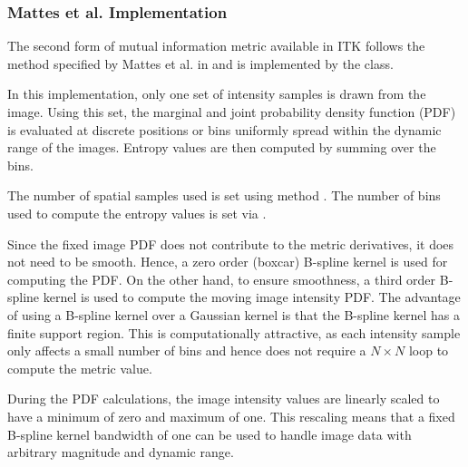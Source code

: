 \subsubsection{Mattes et al. Implementation}
The second form of mutual information metric available in ITK follows the
method specified by Mattes et al. in \cite{Mattes2001} and is implemented by
the  class.

In this implementation, only one set of intensity samples is drawn from the
image.  Using this set, the marginal and joint probability density function
(PDF) is evaluated at discrete positions or bins uniformly spread within the
dynamic range of the images. Entropy values are then computed by summing over
the bins.


The number of spatial samples used is set using method 
. The number of bins used to compute
the entropy values is set via .

Since the fixed image PDF does not contribute to the metric derivatives, it
does not need to be smooth. Hence, a zero order (boxcar) B-spline kernel is
used for computing the PDF. On the other hand, to ensure smoothness, a third
order B-spline kernel is used to compute the moving image intensity PDF. The
advantage of using a B-spline kernel over a Gaussian kernel is that the
B-spline kernel has a finite support region. This is computationally
attractive, as each intensity sample only affects a small number of bins and
hence does not require a $N \times N$ loop to compute the metric value.

During the PDF calculations, the image intensity values are linearly scaled
to have a minimum of zero and maximum of one. This rescaling means that a
fixed B-spline kernel bandwidth of one can be used to handle image data with
arbitrary magnitude and dynamic range.
